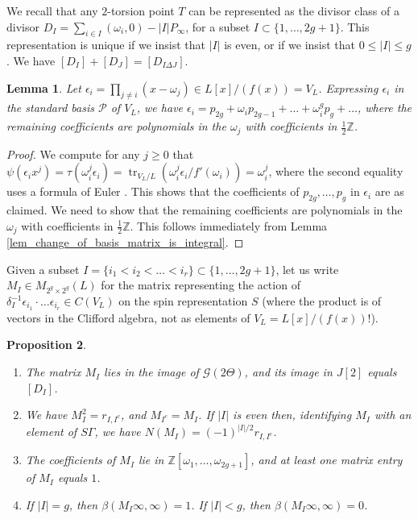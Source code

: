 \documentclass{article} %
\newtheorem{proposition}{Proposition}[section]
\newtheorem{lemma}[proposition]{Lemma}
\numberwithin{equation}{section}
\DeclareMathOperator{\tr}{tr}
\newcommand{\Z}{\mathbb{Z}}
\begin{document}
We recall that any $2$-torsion point $T$ can be represented as the divisor class of a divisor $D_I = \sum_{i \in I} (\omega_i, 0) - |I| P_\infty$, for a subset $I \subset \{ 1, \dots, 2g+1 \}$. This representation is unique if we insist that $|I|$ is even, or if we insist that $0 \leq |I| \leq g$. We have $[D_I] + [D_{J}] = [D_{I \Delta J}]$. 
\begin{lemma}\label{lem_representing_idempotent_in_J_basis}
    Let $\epsilon_i = \prod_{j \neq i}(x - \omega_j) \in L[x] / (f(x)) = V_L$. Expressing $\epsilon_i$ in the standard basis $\mathcal{P}$ of $V_L$, we have $\epsilon_i = p_{2g} + \omega_i p_{2g-1} + \dots + \omega_i^g p_g + \dots$, where the remaining coefficients are polynomials in the $\omega_j$ with coefficients in $\frac{1}{2}\Z$.
\end{lemma}
\begin{proof}
    We compute for any $j \geq 0$ that $\psi(\epsilon_i x^j) = \tau(\omega_i^j \epsilon_i) = \tr_{V_L / L}(\omega_i^j \epsilon_i / f'(\omega_i)) = \omega_i^j$, where the second equality uses a formula of Euler \cite[Chapter III, \S6]{serre-localfields}. This shows that the coefficients of $p_{2g}, \dots, p_g$ in $\epsilon_i$ are as claimed. We need to show that the remaining coefficients are polynomials in the $\omega_j$ with coefficients in $\frac{1}{2} \Z$. This follows immediately from Lemma \ref{lem_change_of_basis_matrix_is_integral}. 
\end{proof}
Given a subset $I = \{ i_1 < i_2 < \dots < i_r \} \subset \{1, \dots, 2g+1\}$, let us write $M_I \in M_{2^g \times 2^g}(L)$ for the matrix representing the action of $\delta_I^{-1} \epsilon_{i_1} \cdot \dots \epsilon_{i_r} \in C(V_L)$ on the spin representation $S$ (where the product is of vectors in the Clifford algebra, not as elements of $V_L = L[x] / (f(x))$!).
\begin{proposition}\label{prop_properties_of_heisenberg_matrix}
    \begin{enumerate}
        \item The matrix $M_I$ lies in the image of $\mathcal{G}(2\Theta)$, and its image in $J[2]$ equals $[D_I]$. 
        \item We have $M_I^2 = r_{I, I^c}$, and $M_{I^c} = M_I$. If $|I|$ is even then, identifying $M_I$ with an element of $S \Gamma$, we have $N(M_I) = (-1)^{|I|/2} r_{I, I^c}$.
        \item The coefficients of $M_I$ lie in $\Z[\omega_1, \dots, \omega_{2g+1}]$, and at least one matrix entry of $M_I$ equals $1$. 
        \item If $|I| = g$, then $\beta(M_I \infty, \infty) = 1$. If $|I| < g$, then $\beta (M_I \infty, \infty) = 0$.
    \end{enumerate}
\end{proposition}
\end{document}
